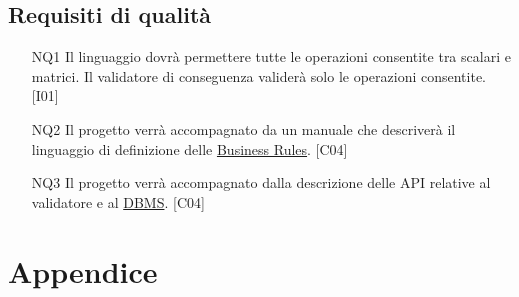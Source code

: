 \section{Requisiti di qualit\`a}
\begin{itemize}
\item[NQ1]{Il linguaggio dovr\`a permettere tutte le operazioni consentite tra scalari e matrici. Il validatore di conseguenza valider\`a solo le operazioni consentite. [I01]}
\item[NQ2]{Il progetto verr\`a accompagnato da un manuale che descriver\`a il linguaggio di definizione delle \underline{Business Rules}. [C04]}
\item[NQ3]{Il progetto verr\`a accompagnato dalla descrizione delle API relative al validatore e al \underline{DBMS}. [C04]}
\end{itemize}
\newpage


\chapter{Appendice}
